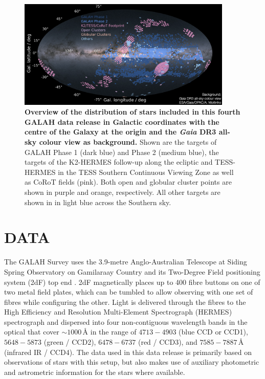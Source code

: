 \documentclass[
  journal=pasa,
  manuscript=research-paper, %
  year=2024,
  volume=37
]{cup-journal}
\newcommand{\Gaia}{\textit{Gaia}\xspace}
\begin{document}
\begin{figure}[ht]
 \centering
 \includegraphics[width=0.91\textwidth]{figures/galah_dr4_skymap_gaiadr3.png}
 \caption{\textbf{Overview of the distribution of stars included in this fourth GALAH data release in Galactic coordinates with the centre of the Galaxy at the origin and the \Gaia DR3 all-sky colour view \citep{GaiaDR3} as background.}
Shown are the targets of GALAH Phase 1 (dark blue) and Phase 2 (medium blue), the targets of the K2-HERMES follow-up along the ecliptic and TESS-HERMES in the TESS Southern Continuous Viewing Zone as well as CoRoT fields (pink). Both open and globular cluster points are shown in purple and orange, respectively. All other targets are shown in in light blue across the Southern sky.
}
 \label{fig:galah_dr4_skymap_gaiadr3}
\end{figure}

\section{DATA}
\label{sec:data}

The GALAH Survey uses the 3.9-metre Anglo-Australian Telescope at Siding Spring Observatory on Gamilaraay Country and its Two-Degree Field positioning system (2dF) top end \citep{Lewis2002}. 2dF magnetically places up to 400 fibre buttons on one of two metal field plates, which can be tumbled to allow observing with one set of fibres while configuring the other. Light is delivered through the fibres to the High Efficiency and Resolution Multi-Element Spectrograph (HERMES) spectrograph \citep{Barden2010, Brzeski2011, Heijmans2012, Farrell2014, Sheinis2015} and dispersed into four non-contiguous wavelength bands in the optical that cover $\sim 1000\,\text{\AA}$ in the range of $4713-4903$ (blue CCD or CCD1), $5648-5873$ (green / CCD2), $6478-6737$ (red / CCD3), and $7585-7887\,\text{\AA}$ (infrared IR / CCD4). The data used in this data release is primarily based on observations of stars with this setup, but also makes use of auxiliary photometric and astrometric information for the stars where available.
\end{document}
